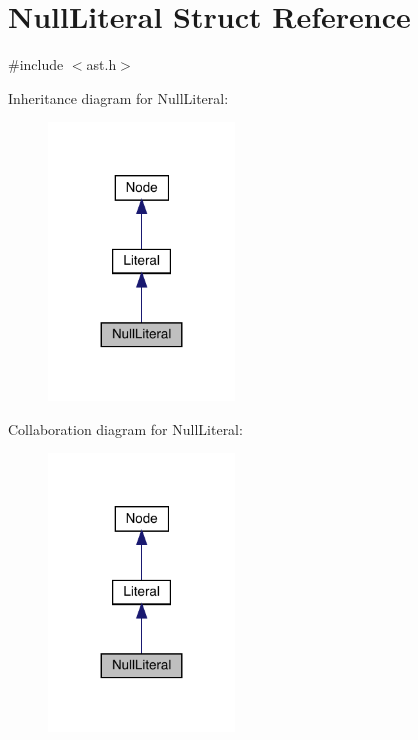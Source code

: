 \hypertarget{struct_null_literal}{}\section{Null\+Literal Struct Reference}
\label{struct_null_literal}


{\ttfamily \#include $<$ast.\+h$>$}



Inheritance diagram for Null\+Literal\+:
\nopagebreak
\begin{figure}[H]
\begin{center}
\leavevmode
\includegraphics[width=140pt]{struct_null_literal__inherit__graph}
\end{center}
\end{figure}


Collaboration diagram for Null\+Literal\+:
\nopagebreak
\begin{figure}[H]
\begin{center}
\leavevmode
\includegraphics[width=140pt]{struct_null_literal__coll__graph}
\end{center}
\end{figure}

